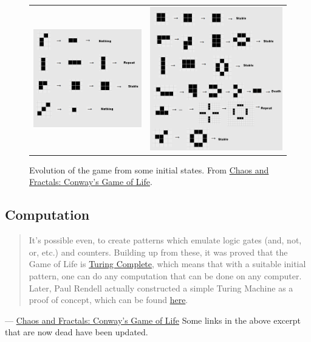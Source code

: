 \documentclass[addpoints]{exam}
\begin{document}
\begin{figure}[!h]
  \centering
  \begin{tabular}{cc}
    \includegraphics[width=.48\textwidth]{pattern1}
    & \includegraphics[width=.48\textwidth]{pattern2}
  \end{tabular}
  \caption{Evolution of the game from some initial states. From \href{http://pi.math.cornell.edu/~lipa/mec/lesson6.html}{Chaos and Fractals: Conway's Game of Life}.}
\end{figure}


\subsection{Computation}
\begin{quotation}
  It's possible even, to create patterns which emulate logic gates (and, not, or, etc.) and counters. Building up from these, it was proved that the Game of Life is \href{https://simple.wikipedia.org/wiki/Turing_complete}{Turing Complete}, which means that with a suitable initial pattern, one can do any computation that can be done on any computer. Later, Paul Rendell actually constructed a simple Turing Machine as a proof of concept, which can be found \href{https://www.ics.uci.edu/~welling/teaching/271fall09/Turing-Machine-Life.pdf}{here}.
\end{quotation}
\raggedleft --- \href{http://pi.math.cornell.edu/~lipa/mec/lesson6.html}{Chaos and Fractals: Conway's Game of Life}
\justify
Some links in the above excerpt that are now dead have been updated.
\end{document}
